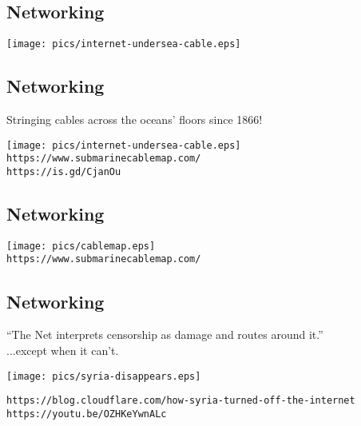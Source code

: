 \documentclass[xga]{xdvislides}
\begin{document}
\subsection{Networking}
\vspace*{\fill}
\begin{center}
	\texttt{[image: pics/internet-undersea-cable.eps]} \\
\end{center}
\vspace*{\fill}


\subsection{Networking}
Stringing cables across the oceans' floors since 1866!
\vspace*{\fill}
\begin{center}
	\texttt{[image: pics/internet-undersea-cable.eps]} \\
	\verb+https://www.submarinecablemap.com/+ \\
	\verb+https://is.gd/CjanOu+
\end{center}
\vspace*{\fill}

\subsection{Networking}
\vspace*{\fill}
\begin{center}
	\texttt{[image: pics/cablemap.eps]} \\
	\verb+https://www.submarinecablemap.com/+ \\
\end{center}
\vspace*{\fill}



\subsection{Networking}
``The Net interprets censorship as damage and routes around it.'' \\

...except when it can't.

\begin{center}
\vspace*{\fill}
	\texttt{[image: pics/syria-disappears.eps]} \\
\vspace*{\fill}

{\tt https://blog.cloudflare.com/how-syria-turned-off-the-internet} \\
{\tt https://youtu.be/OZHKeYwnALc}
\end{center}
\end{document}
